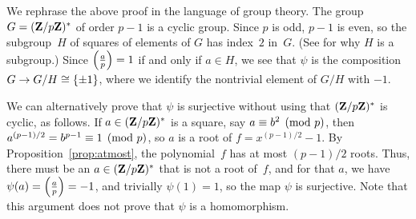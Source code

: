 \begin{remark}
  We rephrase the  above proof in the language of group theory. The group
  $G=(\mathbf{Z}/p\mathbf{Z}{})^*$ of order $p-1$ is a cyclic group.  Since $p$ is
  odd, $p-1$ is even, so the subgroup~$H$ of squares of elements of
  $G$ has index~$2$ in~$G$.  (See 
  for why $H$ is a subgroup.)  Since $\left(\frac{a}{p}\right)=1$ if and only if
  $a\in H$, we see that $\psi$ is the composition $G\to G/H\cong \{\pm
  1\}$, where we identify the nontrivial element of $G/H$ with $-1$.
\end{remark}

\begin{remark}
  We can alternatively prove that $\psi$ is surjective without using
  that $(\mathbf{Z}/p\mathbf{Z}{})^*$ is cyclic, as follows.  If $a\in(\mathbf{Z}/p\mathbf{Z}{})^*$ is
  a square, say $a\equiv b^2\pmod{p}$, then $a^{(p-1)/2} = b^{p-1}\equiv
  1\pmod{p}$, so $a$ is a root of $f=x^{(p-1)/2}-1$.  By
  Proposition~\ref{prop:atmost}, the polynomial~$f$ has at most
  $(p-1)/2$ roots.  Thus, there must be an $a\in(\mathbf{Z}/p\mathbf{Z}{})^*$ that is
  not a root of~$f$, and for that $a$, we have $\psi(a)=\left(\frac{a}{p}\right)=-1$,
  and trivially $\psi(1)=1$, so the map $\psi$ is surjective.  Note
  that this argument does not prove that $\psi$ is a homomorphism.
\end{remark}


